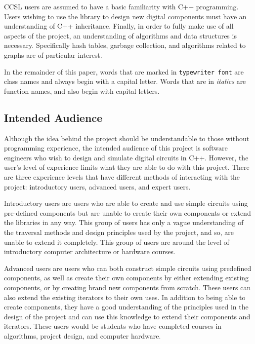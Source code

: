 \documentclass{article}
\newcommand{\ClassName}[1]{\texttt{#1}}
\newcommand{\FunctionName}[1]{\textit{#1}}
\begin{document}
CCSL users are assumed to have a basic familiarity with C++ programming. Users wishing to use the library to design new digital components must have an understanding of C++ inheritance\cite{bjarne}. Finally, in order to fully make use of all aspects of the project, an understanding of algorithms and data structures is necessary. Specifically hash tables, garbage collection, and algorithms related to graphs are of particular interest.

In the remainder of this paper, words that are marked in \ClassName{typewriter font} are class names and always begin with a capital letter. Words that are in \FunctionName{italics} are function names, and also begin with capital letters.

\subsection{Intended Audience}

Although the idea behind the project should be understandable to those without programming experience, the intended audience of this project is software engineers who wish to design and simulate digital circuits in C++. However, the user's level of experience limits what they are able to do with this project. There are three experience levels that have different methods of interacting with the project: introductory users, advanced users, and expert users.

Introductory users are users who are able to create and use simple circuits using pre-defined components but are unable to create their own components or extend the libraries in any way. This group of users has only a vague understanding of the traversal methods and design principles used by the project, and so, are unable to extend it completely. This group of users are around the level of introductory computer architecture or hardware courses.

Advanced users are users who can both construct simple circuits using predefined components, as well as create their own components by either extending existing components, or by creating brand new components from scratch. These users can also extend the existing iterators to their own uses. In addition to being able to create components, they have a good understanding of the principles used in the design of the project and can use this knowledge to extend their components and iterators. These users would be students who have completed courses in algorithms, project design, and computer hardware.
\end{document}
